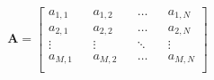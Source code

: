 \documentclass[../main.tex]{subfiles}%
\begin{document}
%
    \Xequation%
    \begin{equation}%
        \mathbf{A} =%
        \begin{bmatrix}%
            a_{1,1} && a_{1,2} && \dots  && a_{1,N} \\%
            a_{2,1} && a_{2,2} && \dots  && a_{2,N} \\%
            \vdots && \vdots && \ddots && \vdots \\%
            a_{M,1} && a_{M,2} && \dots  && a_{M,N} \\%
        \end{bmatrix}%
        \label{eq:image-matrix-traditional}%
    \end{equation}%
\end{document}
